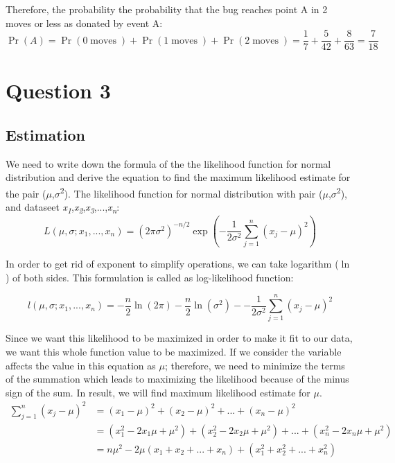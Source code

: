 \documentclass{article}
\DeclareMathOperator{\CondProb}{Pr}
\DeclareMathOperator{\moves}{moves}
\newcommand{\writex}[2]{{\it{#1\textsubscript#2}}}
\begin{document}
Therefore, the probability the probability that the bug reaches point A in 2 moves or less as donated by event A:
\begin{equation*}
	\CondProb{(A)} =  \CondProb{(0 \moves)} + \CondProb{(1\moves)}  + \CondProb{(2\moves)}= \frac{1}{7} +  \frac{5}{42} +  \frac{8}{63} = \boxed{\frac{7}{18}}
\end{equation*}

\section{Question 3}
\subsection{Estimation}
We need to write down the formula of the the likelihood function for normal distribution and derive the equation to find the maximum likelihood estimate for the pair ($\mu$,$\sigma$\textsuperscript{2}).
\newline\newline
The likelihood function for normal distribution with pair ($\mu$,$\sigma$\textsuperscript{2}), and dataseet \writex{x}{1},\writex{x}{2},\writex{x}{3},...,\writex{x}{n}:
\begin{equation*}
	L\left(\mu,\sigma;x_1,...,x_n\right) = \left(2\pi\sigma^2\right)^{-n/2}\exp\left(-\frac{1}{2\sigma^2}\sum_{j=1}^{n} \left(x_j-\mu\right)^{2}\right)
\end{equation*}

In order to get rid of exponent to simplify operations, we can take logarithm ($\ln$) of both sides. This formulation is called as log-likelihood function:

\begin{equation*}
	l\left(\mu,\sigma;x_1,...,x_n\right) = -\frac{n}{2}\ln(2\pi)-\frac{n}{2}\ln\left(\sigma^{2}\right)--\frac{1}{2\sigma^2}\sum_{j=1}^{n} \left(x_j-\mu\right)^{2}
\end{equation*}

Since we want this likelihood to be maximized in order to make it fit to our data, we want this whole function value to be maximized. If we consider the variable affects the value in this equation as $\mu$; therefore, we need to minimize the terms of the summation which leads to maximizing the likelihood because of the minus sign of the sum. In result, we will find maximum likelihood estimate for $\mu$.  
\begin{equation*}
	\begin{aligned}
	\sum_{j=1}^{n} \left(x_j-\mu\right)^{2} &= \left(x_1-\mu\right)^{2} + \left(x_2-\mu\right)^{2} + ... + \left(x_n-\mu\right)^{2} \\
	&= \left(x_1^{2}-2x_1\mu +\mu^{2}\right) + \left(x_2^{2}-2x_2\mu +\mu^{2}\right) + ... + \left(x_n^{2}-2x_n\mu +\mu^{2}\right) \\
	&= n\mu^{2} -2\mu(x_1+x_2+...+x_n) + (x_1^{2}+x_2^{2}+...+x_n^{2})
	\end{aligned}
\end{equation*}
\end{document}
